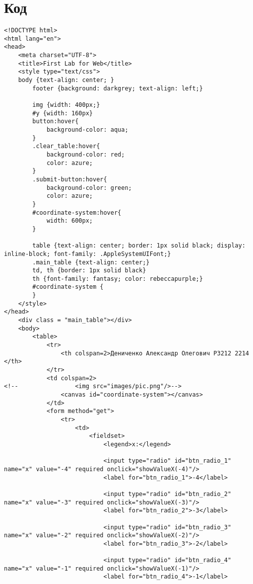 \documentclass{article}
\begin{document}
\section{Код}
\begin{verbatim}
<!DOCTYPE html>
<html lang="en">
<head>
    <meta charset="UTF-8">
    <title>First Lab for Web</title>
    <style type="text/css">
    body {text-align: center; }
        footer {background: darkgrey; text-align: left;}

        img {width: 400px;}
        #y {width: 160px}
        button:hover{
            background-color: aqua;
        }
        .clear_table:hover{
            background-color: red;
            color: azure;
        }
        .submit-button:hover{
            background-color: green;
            color: azure;
        }
        #coordinate-system:hover{
            width: 600px;
        }

        table {text-align: center; border: 1px solid black; display: inline-block; font-family: .AppleSystemUIFont;}
        .main_table {text-align: center;}
        td, th {border: 1px solid black}
        th {font-family: fantasy; color: rebeccapurple;}
        #coordinate-system {
        }
    </style>
</head>
    <div class = "main_table"></div>
    <body>
        <table>
            <tr>
                <th colspan=2>Дениченко Александр Олегович P3212 2214 </th>
            </tr>
            <td colspan=2>
<!--                <img src="images/pic.png"/>-->
                <canvas id="coordinate-system"></canvas>
            </td>
            <form method="get">
                <tr>
                    <td>
                        <fieldset>
                            <legend>x:</legend>

                            <input type="radio" id="btn_radio_1" name="x" value="-4" required onclick="showValueX(-4)"/>
                            <label for="btn_radio_1">-4</label>

                            <input type="radio" id="btn_radio_2" name="x" value="-3" required onclick="showValueX(-3)"/>
                            <label for="btn_radio_2">-3</label>

                            <input type="radio" id="btn_radio_3" name="x" value="-2" required onclick="showValueX(-2)"/>
                            <label for="btn_radio_3">-2</label>

                            <input type="radio" id="btn_radio_4" name="x" value="-1" required onclick="showValueX(-1)"/>
                            <label for="btn_radio_4">-1</label>


\end{verbatim}
\end{document}
